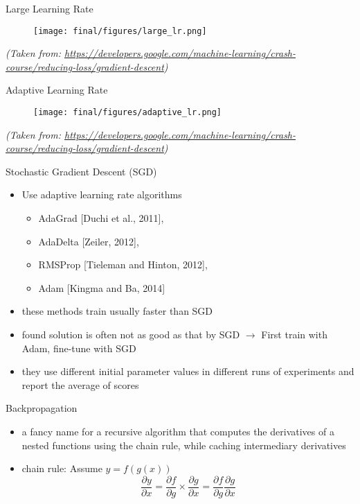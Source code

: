 \begin{frame}{Large Learning Rate}
         \begin{figure}
        \centering
          \texttt{[image: final/figures/large\_lr.png]}
        \end{figure}
\vspace*{\fill}
\textit{\tiny{(Taken from: 
\url{https://developers.google.com/machine-learning/crash-course/reducing-loss/gradient-descent})}}
\end{frame}
\begin{frame}{Adaptive Learning Rate}
         \begin{figure}
        \centering
        \texttt{[image: final/figures/adaptive\_lr.png]}
        \end{figure}
\vspace*{\fill}
\textit{\tiny{(Taken from: 
\url{https://developers.google.com/machine-learning/crash-course/reducing-loss/gradient-descent})}}
\end{frame}
\begin{frame}{Stochastic Gradient Descent (SGD)}
    \begin{itemize}
        \item<1-> Use adaptive learning rate algorithms 
        \begin{itemize}
            \item<1->  AdaGrad [Duchi et al., 2011], 
            \item<1-> AdaDelta [Zeiler, 2012], 
            \item<1-> RMSProp [Tieleman and Hinton, 2012], 
            \item<1-> Adam [Kingma and Ba, 2014] 
        \end{itemize}
        \item<2-> these methods train usually faster than SGD
        \item<3-> found solution is often not as good as that by SGD $\rightarrow$ First train with Adam, fine-tune with SGD
        \item<4-> they use different initial parameter values in different runs of experiments and report the average of scores
    \end{itemize}
\end{frame}
\begin{frame}{Backpropagation}
\begin{itemize}
    \item<1-> a fancy name for a recursive algorithm that computes the derivatives of a nested functions using the chain rule, while caching intermediary derivatives 
    \item<2-> chain rule: Assume $y = f(g(x))$
    \begin{equation*}
        \frac{\partial y}{\partial x} = \frac{\partial f}{\partial g}\times \frac{\partial g}{\partial x}   = \frac{\partial f}{\partial g}\frac{\partial g}{\partial x}
    \end{equation*}
\end{itemize}
\end{frame}
